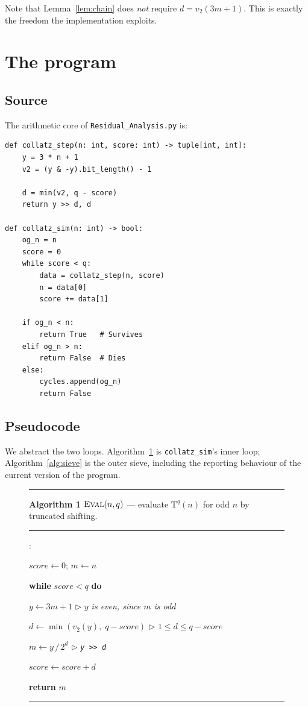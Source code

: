 \documentclass[11pt,a4paper]{article}
\theoremstyle{plain}
\theoremstyle{definition}
\newcounter{algline}
\newenvironment{pseudocode}
  {\begin{list}{\footnotesize\sffamily\arabic{algline}:}%
     {\usecounter{algline}%
      \setlength{\leftmargin}{2.4em}\setlength{\labelwidth}{1.6em}%
      \setlength{\labelsep}{0.8em}\setlength{\itemsep}{1pt}%
      \setlength{\parsep}{0pt}\setlength{\topsep}{4pt}}}
  {\end{list}}
\newcommand{\kw}[1]{\textbf{#1}}
\newcommand{\ind}{\hspace*{1.4em}}
\newcommand{\comm}[1]{{\color{gray}\(\triangleright\) \textit{#1}}}
\newcommand{\Tmap}{\mathrm{T}}
\newcommand{\vtwo}{v_2}
\begin{document}
Note that Lemma~\ref{lem:chain} does \emph{not} require $d = \vtwo(3m+1)$. This
is exactly the freedom the implementation exploits.

\section{The program}
\label{sec:prog}

\subsection{Source}

The arithmetic core of \texttt{Residual\_Analysis.py} is:

\begin{lstlisting}[style=py]
def collatz_step(n: int, score: int) -> tuple[int, int]:
	y = 3 * n + 1
	v2 = (y & -y).bit_length() - 1

	d = min(v2, q - score)
	return y >> d, d

def collatz_sim(n: int) -> bool:
	og_n = n
	score = 0
	while score < q:
		data = collatz_step(n, score)
		n = data[0]
		score += data[1]

	if og_n < n:
		return True   # Survives
	elif og_n > n:
		return False  # Dies
	else:
		cycles.append(og_n)
		return False
\end{lstlisting}

\subsection{Pseudocode}

We abstract the two loops. Algorithm~\ref{alg:eval} is
\texttt{collatz\_sim}'s inner loop; Algorithm~\ref{alg:sieve} is the outer
sieve, including the reporting behaviour of the current version of the
program.

\begin{figure}[htb]
\hrule\vspace{4pt}
\noindent\textbf{Algorithm 1}\; $\textsc{Eval}(n, q)$ ---
evaluate $\Tmap^{q}(n)$ for odd $n$ by truncated shifting.
\vspace{2pt}\hrule
\begin{pseudocode}
\item $\mathit{score} \gets 0$; \quad $m \gets n$
\item \kw{while} $\mathit{score} < q$ \kw{do}
\item \ind $y \gets 3m + 1$ \hfill \comm{$y$ is even, since $m$ is odd}
\item \ind $d \gets \min\!\left(\vtwo(y),\; q - \mathit{score}\right)$
        \hfill \comm{$1 \leq d \leq q - \mathit{score}$}
\item \ind $m \gets y \,/\, 2^{d}$ \hfill \comm{\texttt{y >> d}}
\item \ind $\mathit{score} \gets \mathit{score} + d$
\item \kw{return} $m$
\end{pseudocode}
\hrule
\caption{}
\label{alg:eval}
\end{figure}
\end{document}
